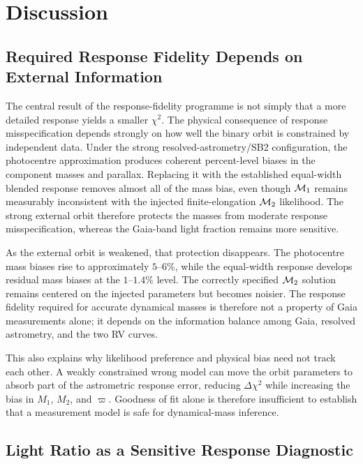 \section{Discussion}
\label{sect:discussion}

\subsection{Required Response Fidelity Depends on External Information}

The central result of the response-fidelity programme is not simply that a more detailed response yields a smaller $\chi^2$. The physical consequence of response misspecification depends strongly on how well the binary orbit is constrained by independent data. Under the strong resolved-astrometry/SB2 configuration, the photocentre approximation produces coherent percent-level biases in the component masses and parallax. Replacing it with the established equal-width blended response removes almost all of the mass bias, even though $\mathcal{M}_1$ remains measurably inconsistent with the injected finite-elongation $\mathcal{M}_2$ likelihood. The strong external orbit therefore protects the masses from moderate response misspecification, whereas the Gaia-band light fraction remains more sensitive.

As the external orbit is weakened, that protection disappears. The photocentre mass biases rise to approximately $5$--$6\%$, while the equal-width response develops residual mass biases at the $1$--$1.4\%$ level. The correctly specified $\mathcal{M}_2$ solution remains centered on the injected parameters but becomes noisier. The response fidelity required for accurate dynamical masses is therefore not a property of Gaia measurements alone; it depends on the information balance among Gaia, resolved astrometry, and the two RV curves.

This also explains why likelihood preference and physical bias need not track each other. A weakly constrained wrong model can move the orbit parameters to absorb part of the astrometric response error, reducing $\Delta\chi^2$ while increasing the bias in $M_1$, $M_2$, and $\varpi$. Goodness of fit alone is therefore insufficient to establish that a measurement model is safe for dynamical-mass inference.

\subsection{Light Ratio as a Sensitive Response Diagnostic}

